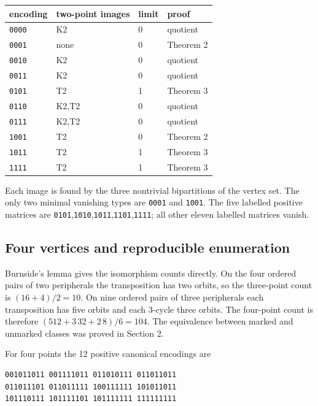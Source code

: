 \documentclass[11pt]{article}
\begin{document}
\begin{center}\small
\begin{tabular}{llll}
\toprule
encoding & two-point images & limit & proof\\
\midrule
\texttt{0000} & K2 & 0 & quotient\\
\texttt{0001} & none & 0 & Theorem 2\\
\texttt{0010} & K2 & 0 & quotient\\
\texttt{0011} & K2 & 0 & quotient\\
\texttt{0101} & T2 & 1 & Theorem 3\\
\texttt{0110} & K2,T2 & 0 & quotient\\
\texttt{0111} & K2,T2 & 0 & quotient\\
\texttt{1001} & T2 & 0 & Theorem 2\\
\texttt{1011} & T2 & 1 & Theorem 3\\
\texttt{1111} & T2 & 1 & Theorem 3\\
\bottomrule
\end{tabular}
\end{center}

Each image is found by the three nontrivial bipartitions of the vertex set. The only two minimal vanishing types are \texttt{0001} and \texttt{1001}. The five labelled positive matrices are \texttt{0101},\texttt{1010},\texttt{1011},\texttt{1101},\texttt{1111}; all other eleven labelled matrices vanish.

\subsection{Four vertices and reproducible enumeration}

Burnside's lemma gives the isomorphism counts directly. On the four ordered pairs of two peripherals the transposition has two orbits, so the three-point count is $(16+4)/2=10$. On nine ordered pairs of three peripherals each transposition has five orbits and each 3-cycle three orbits. The four-point count is therefore $(512+3\,32+2\,8)/6=104$. The equivalence between marked and unmarked classes was proved in Section 2.

For four points the 12 positive canonical encodings are

\begin{Verbatim}[fontsize=\small]
001011011 001111011 011010111 011011011
011011101 011011111 100111111 101011011
101110111 101111101 101111111 111111111
\end{Verbatim}
\end{document}
